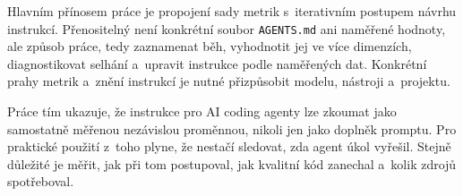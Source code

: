 Hlavním přínosem práce je propojení sady metrik s~iterativním
postupem návrhu instrukcí. Přenositelný není konkrétní soubor
\texttt{AGENTS.md} ani naměřené hodnoty, ale způsob práce, tedy
zaznamenat běh, vyhodnotit jej ve více dimenzích, diagnostikovat
selhání a~upravit instrukce podle naměřených dat. Konkrétní prahy
metrik a~znění instrukcí je nutné přizpůsobit modelu, nástroji
a~projektu.

Práce tím ukazuje, že instrukce pro AI coding agenty lze zkoumat jako
samostatně měřenou nezávislou proměnnou, nikoli jen jako doplněk
promptu. Pro praktické použití z~toho plyne, že nestačí sledovat,
zda agent úkol vyřešil. Stejně důležité je měřit, jak při tom
postupoval, jak kvalitní kód zanechal a~kolik zdrojů spotřeboval.
